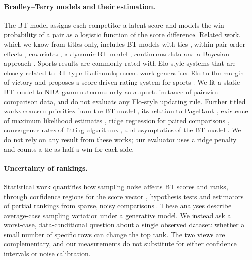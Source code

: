 \documentclass{article}
\begin{document}
\paragraph{Bradley--Terry models and their estimation.}
The BT model \citep{Bradley1952Rank} assigns each competitor a latent score and models the win probability of a pair as a logistic function of the score difference. Related work, which we know from titles only, includes BT models with ties \citep{Davidson1970OnET}, within-pair order effects \citep{Davidson1977OnET}, covariates \citep{Yan2025InferenceIA}, a dynamic BT model \citep{Tian2023ASA}, continuous data \citep{Stern2011ModeratedPC,Fageot2023GeneralizedBM} and a Bayesian approach \citep{Leonard1977AnAB}. Sports results are commonly rated with Elo-style systems that are closely related to BT-type likelihoods; recent work generalises Elo to the margin of victory \citep{Szczecinski2020GElo} and proposes a score-driven rating system for sports \citep{Holy2026ScoreDriven}. We fit a static BT model to NBA game outcomes only as a sports instance of pairwise-comparison data, and do not evaluate any Elo-style updating rule. Further titled works concern priorities from the BT model \citep{Genest1999DerivingPF}, its relation to PageRank \citep{Selby2024PageRankAT}, existence of maximum likelihood estimates \citep{Butler2004TheEO,Bong2021GeneralizedRF}, ridge regression for paired comparisons \citep{Varin2024TractableRR}, convergence rates of fitting algorithms \citep{Vojnovic2019ConvergenceRO}, and asymptotics of the BT model \citep{Simons1999AsymptoticsWT,Li2021ThePO}. We do not rely on any result from these works; our evaluator uses a ridge penalty and counts a tie as half a win for each side.

\paragraph{Uncertainty of rankings.}
Statistical work quantifies how sampling noise affects BT scores and ranks, through confidence regions for the score vector \citep{Gao2021UncertaintyQI}, hypothesis tests \citep{Makur2024MinimaxHT} and estimators of partial rankings from sparse, noisy comparisons \citep{Morel-Balbi2025EstimationOP}. These analyses describe average-case sampling variation under a generative model. We instead ask a worst-case, data-conditional question about a single observed dataset: whether a small number of specific rows can change the top rank. The two views are complementary, and our measurements do not substitute for either confidence intervals or noise calibration.
\end{document}
